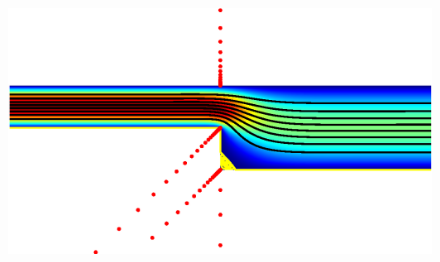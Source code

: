 \documentclass{article}
\begin{document}
\begin{figure}[H]
	\centering
	\includegraphics[width=\linewidth]{Figures/chan}
	

\end{figure}
\end{document}
